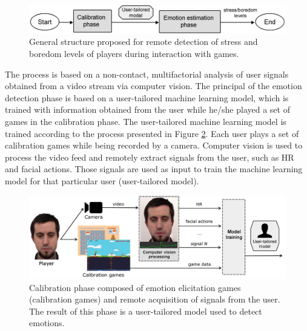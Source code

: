 \begin{figure}[h!]
    \centering
    \includegraphics[width=\textwidth]{figures/research-aim-general.png}
    \caption{General structure proposed for remote detection of stress and boredom levels of players during interaction with games.}
    \label{fig:research-aim-general}
\end{figure}

The process is based on a non-contact, multifactorial analysis of user signals obtained from a video stream via computer vision. The principal of the emotion detection phase is based on a user-tailored machine learning model, which is trained with information obtained from the user while he/she played a set of games in the calibration phase. The user-tailored machine learning model is trained according to the process presented in Figure \ref{fig:user-tailored-calibration}. Each user plays a set of calibration games while being recorded by a camera. Computer vision is used to process the video feed and remotely extract signals from the user, such as HR and facial actions. Those signals are used as input to train the machine learning model for that particular user (user-tailored model).

\begin{figure}[h]
    \centering
    \includegraphics[width=\textwidth]{figures/user-tailored-calibration.png}
    \caption{Calibration phase composed of emotion elicitation games (calibration games) and remote acquisition of signals from the user. The result of this phase is a user-tailored model used to detect emotions.}
    \label{fig:user-tailored-calibration}
\end{figure}

